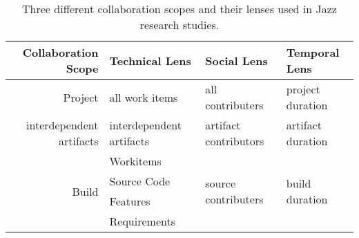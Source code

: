 
\begin{table*}[tb]
\center
\begin{tabular}{rlll}
Collaboration Scope & Technical Lens & Social Lens & Temporal Lens\\
\hline
\hline
Project & all work items & all contributers & project duration \\
\hline
interdependent artifacts & interdependent artifacts & artifact contributors
& artifact duration \\
\hline

\multirow{4}{*}{Build} & Workitems & \multirow{4}{*}{source
contributers} & \multirow{4}{*}{build duration}\\
& Source Code & &\\ 
& Features & &\\ 
& Requirements & &\\
\hline
\hline
\end{tabular}
\caption{Three different collaboration scopes and their lenses used in Jazz
research studies.}
\label{tab:CollaborationScopeExamples}
\end{table*}
